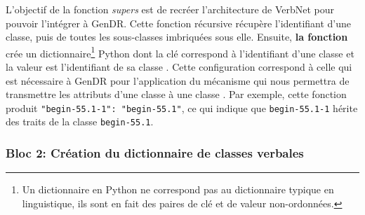 L'objectif de la fonction \emph{supers} est de recréer l'architecture de VerbNet pour pouvoir l'intégrer à GenDR. Cette fonction récursive récupère l'identifiant d'une classe, puis de toutes les sous-classes imbriquées sous elle. Ensuite, \textbf{la fonction} crée un dictionnaire\footnote{Un dictionnaire en Python ne correspond pas au dictionnaire typique en linguistique, ils sont en fait des paires de clé et de valeur non-ordonnées.} Python dont la clé correspond à l'identifiant d'une classe  et la valeur est l'identifiant de sa classe . Cette configuration correspond à celle qui est nécessaire à GenDR pour l'application du mécanisme qui nous permettra de transmettre les attributs d'une classe  à une classe . Par exemple, cette fonction produit \lstinline|"begin-55.1-1": "begin-55.1"|, ce qui indique que \texttt{begin-55.1-1} hérite des traits de la classe \texttt{begin-55.1}.

\subsubsection{Bloc 2: Création du dictionnaire de classes verbales}

